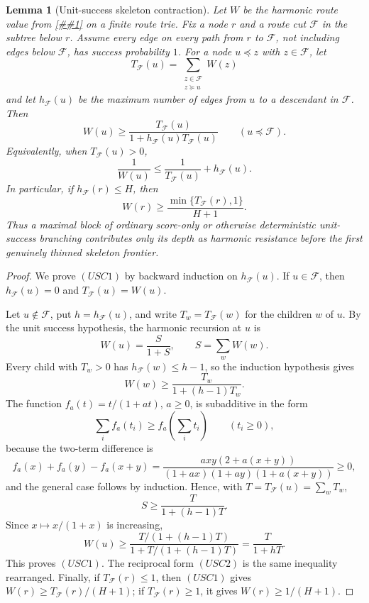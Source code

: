 \documentclass[10pt]{article}
\newcommand{\cref}[1]{\ref{##1}}
\newtheorem{lemma}[theorem]{Lemma}
\theoremstyle{definition}
\begin{document}
\begin{lemma}[Unit-success skeleton contraction]
   \label{lem:unit-success-skeleton-contraction}
   Let \(W\) be the harmonic route value from
   \cref{lem:optimal-prefix-energy-law} on a finite route trie.  Fix a node
   \(r\) and a route cut \(\mathcal F\) in the subtree below \(r\).  Assume
   every edge on every path from \(r\) to \(\mathcal F\), not including edges
   below \(\mathcal F\), has success probability \(1\).  For a node
   \(u\preceq z\) with \(z\in\mathcal F\), let
   \[
      T_{\mathcal F}(u)
      =
      \sum_{\substack{z\in\mathcal F\\ z\succeq u}} W(z)
   \]
   and let \(h_{\mathcal F}(u)\) be the maximum number of edges from \(u\) to
   a descendant in \(\mathcal F\).  Then
   \[
      W(u)
      \ge
      \frac{T_{\mathcal F}(u)}
           {1+h_{\mathcal F}(u)T_{\mathcal F}(u)}
      \qquad
      (u\preceq\mathcal F).
      \tag{USC1}
   \]
   Equivalently, when \(T_{\mathcal F}(u)>0\),
   \[
      \frac1{W(u)}
      \le
      \frac1{T_{\mathcal F}(u)}+h_{\mathcal F}(u).
      \tag{USC2}
   \]
   In particular, if \(h_{\mathcal F}(r)\le H\), then
   \[
      W(r)\ge \frac{\min\{T_{\mathcal F}(r),1\}}{H+1}.
      \tag{USC3}
   \]
   Thus a maximal block of ordinary score-only or otherwise deterministic
   unit-success branching contributes only its depth as harmonic resistance
   before the first genuinely thinned skeleton frontier.
\end{lemma}

\begin{proof}
   We prove \((USC1)\) by backward induction on \(h_{\mathcal F}(u)\).  If
   \(u\in\mathcal F\), then \(h_{\mathcal F}(u)=0\) and
   \(T_{\mathcal F}(u)=W(u)\).

   Let \(u\notin\mathcal F\), put \(h=h_{\mathcal F}(u)\), and write
   \(T_w=T_{\mathcal F}(w)\) for the children \(w\) of \(u\).  By the unit
   success hypothesis, the harmonic recursion at \(u\) is
   \[
      W(u)=\frac{S}{1+S},
      \qquad
      S=\sum_w W(w).
   \]
   Every child with \(T_w>0\) has \(h_{\mathcal F}(w)\le h-1\), so the
   induction hypothesis gives
   \[
      W(w)\ge \frac{T_w}{1+(h-1)T_w}.
   \]
   The function \(f_a(t)=t/(1+at)\), \(a\ge0\), is subadditive in the form
   \[
      \sum_i f_a(t_i)\ge f_a\!\left(\sum_i t_i\right)
      \qquad(t_i\ge0),
   \]
   because the two-term difference is
   \[
      f_a(x)+f_a(y)-f_a(x+y)
      =
      \frac{axy(2+a(x+y))}
           {(1+ax)(1+ay)(1+a(x+y))}
      \ge0,
   \]
   and the general case follows by induction.  Hence,
   with \(T=T_{\mathcal F}(u)=\sum_wT_w\),
   \[
      S\ge \frac{T}{1+(h-1)T}.
   \]
   Since \(x\mapsto x/(1+x)\) is increasing,
   \[
      W(u)\ge
      \frac{T/(1+(h-1)T)}
           {1+T/(1+(h-1)T)}
      =
      \frac{T}{1+hT}.
   \]
   This proves \((USC1)\).  The reciprocal form \((USC2)\) is the same
   inequality rearranged.  Finally, if \(T_{\mathcal F}(r)\le1\), then
   \((USC1)\) gives \(W(r)\ge T_{\mathcal F}(r)/(H+1)\); if
   \(T_{\mathcal F}(r)\ge1\), it gives \(W(r)\ge1/(H+1)\).
\end{proof}
\end{document}
